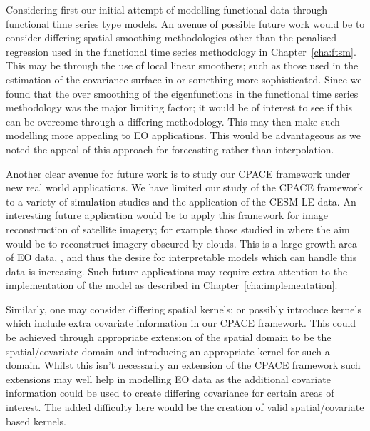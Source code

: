 Considering first our initial attempt of modelling functional data through functional time series type models. 
An avenue of possible future work would be to consider differing spatial smoothing methodologies other than the penalised regression used in the functional time series methodology in Chapter~\ref{cha:ftsm}. 
This may be through the use of local linear smoothers; such as those used in the estimation of the covariance surface in \citep{yao_functional_2005} or something more sophisticated.
Since we found that the over smoothing of the eigenfunctions in the functional time series methodology was the major limiting factor; it would be of interest to see if this can be overcome through a differing methodology.
This may then make such modelling more appealing to EO applications.
This would be advantageous as we noted the appeal of this approach for forecasting rather than interpolation. 

Another clear avenue for future work is to study our CPACE framework under new real world applications. 
We have limited our study of the CPACE framework to a variety of simulation studies and the application of the CESM-LE data.
An interesting future application would be to apply this framework for image reconstruction of satellite imagery; for example those studied in \citep{meraner_cloud_2020} where the aim would be to reconstruct imagery obscured by clouds.
This is a large growth area of EO data, \citep{aschbacher_european_2012}, and thus the desire for interpretable models which can handle this data is increasing.
Such future applications may require extra attention to the implementation of the model as described in Chapter~\ref{cha:implementation}.

Similarly, one may consider differing spatial kernels; or possibly introduce kernels which include extra covariate information in our CPACE framework.
This could be achieved through appropriate extension of the spatial domain to be the spatial/covariate domain and introducing an appropriate kernel for such a domain.
Whilst this isn't necessarily an extension of the CPACE framework such extensions may well help in modelling EO data as the additional covariate information could be used to create differing covariance for certain areas of interest.
The added difficulty here would be the creation of valid spatial/covariate based kernels.

